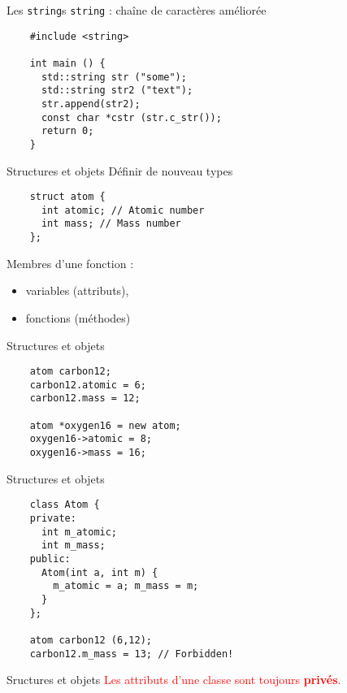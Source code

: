 
\begin{frame}[fragile]{Les \texttt{string}s}
  \texttt{string} : chaîne de caractères améliorée
  \begin{lstlisting}
    #include <string>

    int main () {
      std::string str ("some");
      std::string str2 ("text");
      str.append(str2);
      const char *cstr (str.c_str());
      return 0;
    }
    \end{lstlisting}
\end{frame}

\begin{frame}[fragile]{Structures et objets}
  Définir de nouveau types
  \begin{lstlisting}
    struct atom {
      int atomic; // Atomic number
      int mass; // Mass number
    };
  \end{lstlisting}

  Membres d'une fonction :
  \begin{itemize}
  \item variables (attributs),
  \item fonctions (méthodes)
  \end{itemize}
\end{frame}

\begin{frame}[fragile]{Structures et objets}
  \begin{lstlisting}
    atom carbon12;
    carbon12.atomic = 6;
    carbon12.mass = 12;

    atom *oxygen16 = new atom;
    oxygen16->atomic = 8;
    oxygen16->mass = 16;
  \end{lstlisting}
\end{frame}

\begin{frame}[fragile]{Structures et objets}
  \begin{lstlisting}
    class Atom {
    private:
      int m_atomic;
      int m_mass;
    public:
      Atom(int a, int m) {
        m_atomic = a; m_mass = m;
      }
    };

    atom carbon12 (6,12);
    carbon12.m_mass = 13; // Forbidden!
  \end{lstlisting}
\end{frame}

\begin{frame}{Sructures et objets}
  \textcolor{red}{Les attributs d'une classe sont toujours \textbf{privés}.}
\end{frame}


